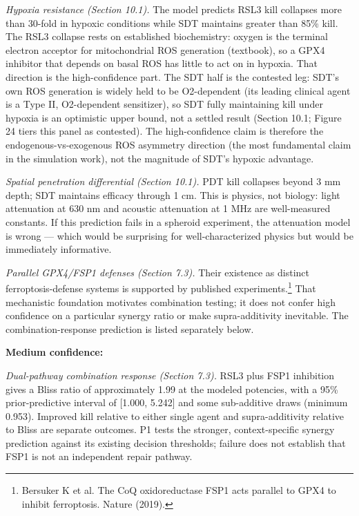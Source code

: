 \documentclass[11pt,twoside,openright]{report}
\begin{document}
\textit{Hypoxia resistance (Section 10.1).} The model predicts RSL3 kill collapses more than 30-fold in hypoxic conditions while SDT maintains greater than 85\% kill. The RSL3 collapse rests on established biochemistry: oxygen is the terminal electron acceptor for mitochondrial ROS generation (textbook), so a GPX4 inhibitor that depends on basal ROS has little to act on in hypoxia. That direction is the high-confidence part. The SDT half is the contested leg: SDT's own ROS generation is widely held to be O2-dependent (its leading clinical agent is a Type II, O2-dependent sensitizer), so SDT fully maintaining kill under hypoxia is an optimistic upper bound, not a settled result (Section 10.1; Figure 24 tiers this panel as contested). The high-confidence claim is therefore the endogenous-vs-exogenous ROS asymmetry direction (the most fundamental claim in the simulation work), not the magnitude of SDT's hypoxic advantage.

\textit{Spatial penetration differential (Section 10.1).} PDT kill collapses beyond 3 mm depth; SDT maintains efficacy through 1 cm. This is physics, not biology: light attenuation at 630 nm and acoustic attenuation at 1 MHz are well-measured constants. If this prediction fails in a spheroid experiment, the attenuation model is wrong --- which would be surprising for well-characterized physics but would be immediately informative.

\textit{Parallel GPX4/FSP1 defenses (Section 7.3).} Their existence as distinct ferroptosis-defense systems is supported by published experiments.\footnote{Bersuker K et al. The CoQ oxidoreductase FSP1 acts parallel to GPX4 to inhibit ferroptosis. Nature (2019).} That mechanistic foundation motivates combination testing; it does not confer high confidence on a particular synergy ratio or make supra-additivity inevitable. The combination-response prediction is listed separately below.

\textbf{Medium confidence:}

\textit{Dual-pathway combination response (Section 7.3).} RSL3 plus FSP1 inhibition gives a Bliss ratio of approximately 1.99 at the modeled potencies, with a 95\% prior-predictive interval of [1.000, 5.242] and some sub-additive draws (minimum 0.953). Improved kill relative to either single agent and supra-additivity relative to Bliss are separate outcomes. P1 tests the stronger, context-specific synergy prediction against its existing decision thresholds; failure does not establish that FSP1 is not an independent repair pathway.
\end{document}
